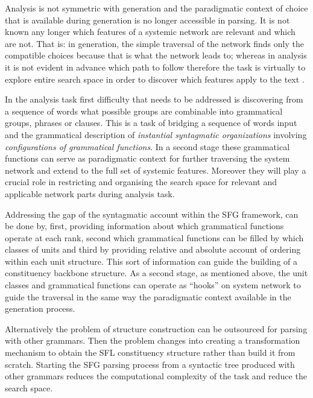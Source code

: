 Analysis is not symmetric with generation and the paradigmatic context of choice that is available during generation is no longer accessible in parsing. It is not known any longer which features of a systemic network are relevant and which are not. That is: in generation, the simple traversal of the network finds only the compatible choices because that is what the network leads to; whereas in analysis it is not evident in advance which path to follow therefore the task is virtually to explore entire search space in order to discover which features apply to the text \citep{Bateman2008}.


In the analysis task first difficulty that needs to be addressed is discovering from a sequence of words what possible groups are combinable into grammatical groups, phrases or clauses. This is a task of bridging a sequence of words input and the grammatical description of \textit{instantial syntagmatic organizations} involving \textit{configurations of grammatical functions}. In a second stage these grammatical functions can serve as paradigmatic context for further traversing the system network and extend to the full set of systemic features. Moreover they will play a crucial role in restricting and organising the search space for relevant and applicable network parts during analysis task.

Addressing the gap of the syntagmatic account within the SFG framework, can be done by, first, providing information about which grammatical functions operate at each rank, second which grammatical functions can be filled by which classes of units and third by providing relative and absolute account of ordering within each unit structure. This sort of information can guide the building of a constituency backbone structure. As a second stage, as mentioned above, the unit classes and grammatical functions can operate as ``hooks'' on system network to guide the traversal in the same way the paradigmatic context available in the generation process. 

Alternatively the problem of structure construction can be outsourced for parsing with other grammars. Then the problem changes into creating a transformation mechanism to obtain the SFL constituency structure rather than build it from scratch. Starting the SFG parsing process from a syntactic tree produced with other grammars reduces the computational complexity of the task and reduce the search space. 

